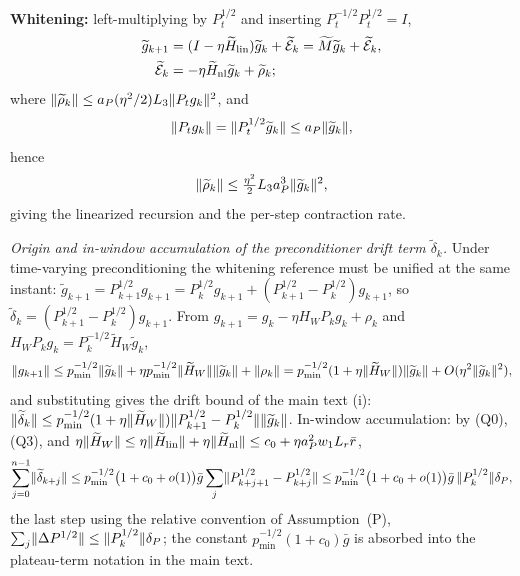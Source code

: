\documentclass[11pt]{article}
\DeclarePairedDelimiter{\norm}{\lVert}{\rVert}
\newcommand{\W}{W}
\newcommand{\Erem}{\mathcal E}
\newcommand{\wt}[1]{\widetilde{#1}}
\numberwithin{equation}{section}
\begin{document}
\noindent\textbf{Whitening:} left-multiplying by $P_t^{1/2}$ and inserting $P_t^{-1/2}P_t^{1/2}=I$,
\begin{align}
\wt g_{k+1}&=(I-\eta\wt H_{\rm lin})\wt g_k+\wt\Erem_k=\wt M\wt g_k+\wt\Erem_k,\\
\wt\Erem_k&=-\eta\wt H_{\rm nl}\wt g_k+\wt\rho_k;
\end{align}
where $\norm{\wt\rho_k}\le a_P(\eta^2/2)L_3\norm{P_tg_k}^2$, and
\begin{equation}
\norm{P_tg_k}=\norm{P_t^{1/2}\wt g_k}\le a_P\norm{\wt g_k},
\end{equation}
hence
\begin{equation}
\norm{\wt\rho_k}\le\tfrac{\eta^2}{2}L_3a_P^3\norm{\wt g_k}^2,
\end{equation}
giving the linearized recursion and the per-step contraction rate.

\medskip
\emph{Origin and in-window accumulation of the preconditioner drift term $\wt\delta_k$.} Under time-varying preconditioning the whitening reference must be unified at the same instant: $\wt g_{k+1}=P_{k+1}^{1/2}g_{k+1}=P_k^{1/2}g_{k+1}+(P_{k+1}^{1/2}-P_k^{1/2})g_{k+1}$, so $\wt\delta_k=(P_{k+1}^{1/2}-P_k^{1/2})g_{k+1}$. From $g_{k+1}=g_k-\eta H_\W P_kg_k+\rho_k$ and $H_\W P_kg_k=P_k^{-1/2}\wt H_\W\wt g_k$,
\begin{equation}
\norm{g_{k+1}}\le p_{\min}^{-1/2}\norm{\wt g_k}+\eta p_{\min}^{-1/2}\norm{\wt H_\W}\norm{\wt g_k}+\norm{\rho_k}
=p_{\min}^{-1/2}(1+\eta\norm{\wt H_\W})\norm{\wt g_k}+O(\eta^2\norm{\wt g_k}^2),
\end{equation}
and substituting gives the drift bound of the main text (i): $\norm{\wt\delta_k}\le p_{\min}^{-1/2}(1+\eta\norm{\wt H_\W})\norm{P_{k+1}^{1/2}-P_k^{1/2}}\norm{\wt g_k}$. In-window accumulation: by (Q0), (Q3), and $\eta\norm{\wt H_\W}\le\eta\norm{\wt H_{\rm lin}}+\eta\norm{\wt H_{\rm nl}}\le c_0+\eta a_P^2w_1L_r\bar r$,
\begin{equation}
\sum_{j=0}^{n-1}\norm{\wt\delta_{k+j}}
\le p_{\min}^{-1/2}\bigl(1+c_0+o(1)\bigr)\bar g\sum_{j}\norm{P_{k+j+1}^{1/2}-P_{k+j}^{1/2}}
\le p_{\min}^{-1/2}\bigl(1+c_0+o(1)\bigr)\bar g\,\norm{P_k^{1/2}}\delta_P,
\end{equation}
the last step using the relative convention of Assumption~(P), $\sum_j\norm{\Delta P^{1/2}}\le\norm{P_k^{1/2}}\delta_P$; the constant $p_{\min}^{-1/2}(1+c_0)\bar g$ is absorbed into the plateau-term notation in the main text.
\end{document}
